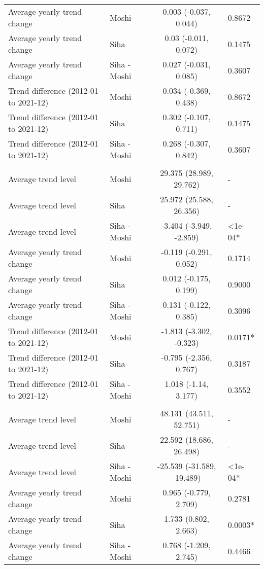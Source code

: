 \begin{longtable}{l|lcl}
Average yearly trend change & Moshi & 0.003 (-0.037, 0.044) & 0.8672 \\ 
Average yearly trend change & Siha & 0.03 (-0.011, 0.072) & 0.1475 \\ 
Average yearly trend change & Siha - Moshi & 0.027 (-0.031, 0.085) & 0.3607 \\ 
Trend difference (2012-01 to 2021-12) & Moshi & 0.034 (-0.369, 0.438) & 0.8672 \\ 
Trend difference (2012-01 to 2021-12) & Siha & 0.302 (-0.107, 0.711) & 0.1475 \\ 
Trend difference (2012-01 to 2021-12) & Siha - Moshi & 0.268 (-0.307, 0.842) & 0.3607 \\ 
\midrule\addlinespace[2.5pt]
\multicolumn{4}{l}{UTCI } \\ 
\midrule\addlinespace[2.5pt]
Average trend level & Moshi & 29.375 (28.989, 29.762) & - \\ 
Average trend level & Siha & 25.972 (25.588, 26.356) & - \\ 
Average trend level & Siha - Moshi & -3.404 (-3.949, -2.859) & <1e-04* \\ 
Average yearly trend change & Moshi & -0.119 (-0.291, 0.052) & 0.1714 \\ 
Average yearly trend change & Siha & 0.012 (-0.175, 0.199) & 0.9000 \\ 
Average yearly trend change & Siha - Moshi & 0.131 (-0.122, 0.385) & 0.3096 \\ 
Trend difference (2012-01 to 2021-12) & Moshi & -1.813 (-3.302, -0.323) & 0.0171* \\ 
Trend difference (2012-01 to 2021-12) & Siha & -0.795 (-2.356, 0.767) & 0.3187 \\ 
Trend difference (2012-01 to 2021-12) & Siha - Moshi & 1.018 (-1.14, 3.177) & 0.3552 \\ 
\midrule\addlinespace[2.5pt]
\multicolumn{4}{l}{Rainfall (mm)} \\ 
\midrule\addlinespace[2.5pt]
Average trend level & Moshi & 48.131 (43.511, 52.751) & - \\ 
Average trend level & Siha & 22.592 (18.686, 26.498) & - \\ 
Average trend level & Siha - Moshi & -25.539 (-31.589, -19.489) & <1e-04* \\ 
Average yearly trend change & Moshi & 0.965 (-0.779, 2.709) & 0.2781 \\ 
Average yearly trend change & Siha & 1.733 (0.802, 2.663) & 0.0003* \\ 
Average yearly trend change & Siha - Moshi & 0.768 (-1.209, 2.745) & 0.4466 \\ 

\end{longtable}
